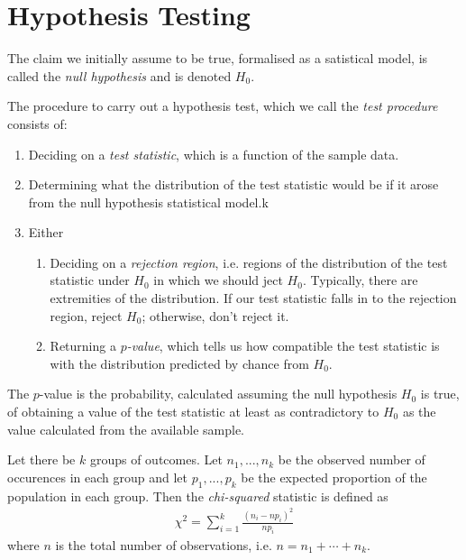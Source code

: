 \documentclass{article}
\begin{document}
\section{Hypothesis Testing}


\begin{definition}
	The claim we initially assume to be true, formalised as a satistical
	model, is called the \emph{null hypothesis} and is denoted $H_0$.
\end{definition}

\begin{definition}
	The procedure to carry out a hypothesis test, which we call the
	\emph{test procedure} consists of:
	\begin{enumerate}
		\item Deciding on a \emph{test statistic}, which is a function
		      of the sample data.
		\item Determining what the distribution of the test statistic would
		      be if it arose from the null hypothesis statistical model.k
		\item Either \begin{enumerate}
			      \item Deciding on a \emph{rejection region}, i.e. regions of
			            the distribution of the test statistic under $H_0$ in
			            which we should ject $H_0$. Typically, there are extremities
			            of the distribution. If our test statistic falls in to the
			            rejection region, reject $H_0$; otherwise, don't reject it.
			      \item Returning a \emph{$p$-value}, which tells us how compatible
			            the test statistic is with the distribution predicted by chance
			            from $H_0$.
		      \end{enumerate}
	\end{enumerate}
\end{definition}

\begin{definition}
	The $p$-value is the probability, calculated assuming the null
	hypothesis $H_0$ is true, of obtaining a value of the test statistic
	at least as contradictory to $H_0$ as the value calculated from
	the available sample.
\end{definition}

\begin{definition}
	Let there be $k$ groups of outcomes. Let $n_1,...,n_k$ be the observed
	number of occurences in each group and let $p_1,...,p_k$ be the
	expected proportion of the population in each group. Then the
	\emph{chi-squared} statistic is defined as
	\begin{align*}
		\chi^2 = \sum_{i=1}^k \frac{(n_i-np_i)^2}{np_i}
	\end{align*}
	where $n$ is the total number of observations, i.e. $n=n_1+\cdots+n_k$.
\end{definition}
\end{document}
